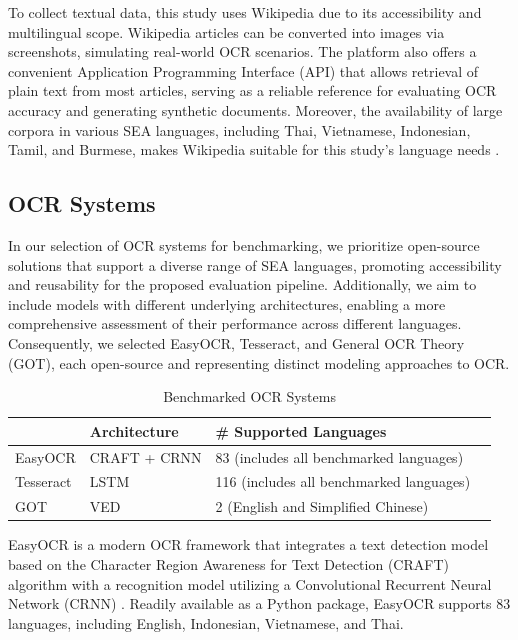 \documentclass[12pt,oneside]{memoir}
\begin{document}
To collect textual data, this study uses Wikipedia due to its accessibility and multilingual scope.
Wikipedia articles can be converted into images via screenshots, simulating real-world OCR scenarios. 
The platform also offers a convenient Application Programming Interface (API) that allows retrieval of plain text from most articles, serving as a reliable reference for evaluating OCR accuracy and generating synthetic documents.
Moreover, the availability of large corpora in various SEA languages, including Thai, Vietnamese, Indonesian, Tamil, and Burmese, makes Wikipedia suitable for this study's language needs \parencite{list-of-wikipedias-2024}.

\subsection{OCR Systems}

In our selection of OCR systems for benchmarking, we prioritize open-source solutions that support a diverse range of SEA languages, promoting accessibility and reusability for the proposed evaluation pipeline. 
Additionally, we aim to include models with different underlying architectures, enabling a more comprehensive assessment of their performance across different languages.
Consequently, we selected EasyOCR, Tesseract, and General OCR Theory (GOT), each open-source and representing distinct modeling approaches to OCR.

\begin{table}[ht]
    \centering
    \caption{Benchmarked OCR Systems}
    \label{table:ocr-systems}
    \begin{tabular}{llll}
        \toprule
        & Architecture & \# Supported Languages\\ 
        \midrule
        EasyOCR & CRAFT + CRNN & 83 (includes all benchmarked languages) & \\
        Tesseract & LSTM & 116 (includes all benchmarked languages)\\
        GOT & VED & 2 (English and Simplified Chinese)\\
        \bottomrule
    \end{tabular}
\end{table}

EasyOCR is a modern OCR framework that integrates a text detection model based on the Character Region Awareness for Text Detection (CRAFT) algorithm with a recognition model utilizing a Convolutional Recurrent Neural Network (CRNN) \parencite{easy-ocr-2025}.
Readily available as a Python package, EasyOCR supports 83 languages, including English, Indonesian, Vietnamese, and Thai.
\end{document}
